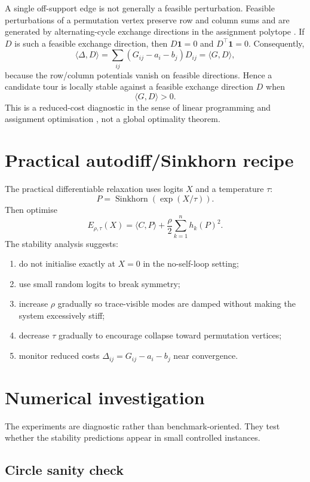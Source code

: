\documentclass[11pt]{article}
\newcommand{\one}{\mathbf 1}
\begin{document}
A single off-support edge is not generally a feasible perturbation. Feasible perturbations of a permutation vertex preserve row and column sums and are generated by alternating-cycle exchange directions in the assignment polytope \citep{balinski1974assignment}. If $D$ is such a feasible exchange direction, then $D\one=0$ and $D^\top\one=0$. Consequently,
\[
    \langle\Delta,D\rangle
    =\sum_{ij}(G_{ij}-a_i-b_j)D_{ij}
    =\langle G,D\rangle,
\]
because the row/column potentials vanish on feasible directions. Hence a candidate tour is locally stable against a feasible exchange direction $D$ when
\[
    \langle G,D\rangle>0.
\]
This is a reduced-cost diagnostic in the sense of linear programming and assignment optimisation \citep{luenberger1984linear}, not a global optimality theorem.

\section{Practical autodiff/Sinkhorn recipe}

The practical differentiable relaxation uses logits $X$ and a temperature $\tau$:
\[
    P=\operatorname{Sinkhorn}(\exp(X/\tau)).
\]
Then optimise
\[
    E_{\rho,\tau}(X)=\langle C,P\rangle+\frac{\rho}{2}\sum_{k=1}^n h_k(P)^2.
\]
The stability analysis suggests:
\begin{enumerate}
    \item do not initialise exactly at $X=0$ in the no-self-loop setting;
    \item use small random logits to break symmetry;
    \item increase $\rho$ gradually so trace-visible modes are damped without making the system excessively stiff;
    \item decrease $\tau$ gradually to encourage collapse toward permutation vertices;
    \item monitor reduced costs $\Delta_{ij}=G_{ij}-a_i-b_j$ near convergence.
\end{enumerate}

\section{Numerical investigation}

The experiments are diagnostic rather than benchmark-oriented. They test whether the stability predictions appear in small controlled instances.

\subsection{Circle sanity check}
\end{document}
